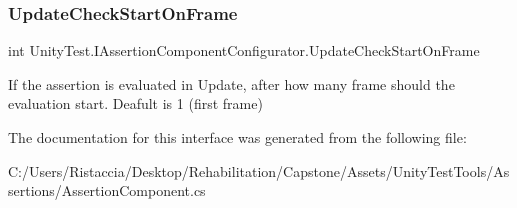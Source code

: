 \subsubsection{\texorpdfstring{Update\+Check\+Start\+On\+Frame}{UpdateCheckStartOnFrame}}
{\footnotesize\ttfamily int Unity\+Test.\+I\+Assertion\+Component\+Configurator.\+Update\+Check\+Start\+On\+Frame\hspace{0.3cm}{\ttfamily [set]}}



If the assertion is evaluated in Update, after how many frame should the evaluation start. Deafult is 1 (first frame) 



The documentation for this interface was generated from the following file\+:\begin{DoxyCompactItemize}
\item 
C\+:/\+Users/\+Ristaccia/\+Desktop/\+Rehabilitation/\+Capstone/\+Assets/\+Unity\+Test\+Tools/\+Assertions/Assertion\+Component.\+cs\end{DoxyCompactItemize}
